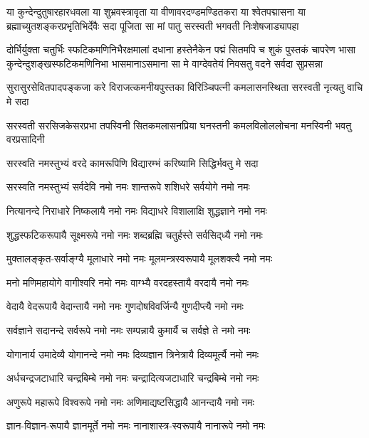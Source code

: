 

\fourlineindentedshloka
{या कुन्देन्दुतुषारहारधवला या शुभ्रवस्त्रावृता}
{या वीणावरदण्डमण्डितकरा या श्वेतपद्मासना}
{या ब्रह्माच्युतशङ्करप्रभृतिभिर्देवैः सदा पूजिता}
{सा मां पातु सरस्वती भगवती निःशेषजाड्यापहा}

\fourlineindentedshloka
{दोर्भिर्युक्ता चतुर्भिः स्फटिकमणिनिभैरक्षमालां दधाना}
{हस्तेनैकेन पद्मं सितमपि च शुकं पुस्तकं चापरेण}
{भासा कुन्देन्दुशङ्खस्फटिकमणिनिभा भासमानाऽसमाना}
{सा मे वाग्देवतेयं निवसतु वदने सर्वदा सुप्रसन्ना}

\fourlineindentedshloka
{सुरासुरसेवितपादपङ्कजा}
{करे विराजत्कमनीयपुस्तका}
{विरिञ्चिपत्नी कमलासनस्थिता}
{सरस्वती नृत्यतु वाचि मे सदा}

\fourlineindentedshloka
{सरस्वती सरसिजकेसरप्रभा}
{तपस्विनी सितकमलासनप्रिया}
{घनस्तनी कमलविलोललोचना}
{मनस्विनी भवतु वरप्रसादिनी}

\twolineshloka
{सरस्वति नमस्तुभ्यं वरदे कामरूपिणि}
{विद्यारम्भं करिष्यामि सिद्धिर्भवतु मे सदा}

\twolineshloka
{सरस्वति नमस्तुभ्यं सर्वदेवि नमो नमः}
{शान्तरूपे शशिधरे सर्वयोगे नमो नमः}

\twolineshloka
{नित्यानन्दे निराधारे निष्कलायै नमो नमः}
{विद्याधरे विशालाक्षि शुद्धज्ञाने नमो नमः}

\twolineshloka
{शुद्धस्फटिकरूपायै सूक्ष्मरूपे नमो नमः}
{शब्दब्रह्मि चतुर्हस्ते सर्वसिद्‌ध्यै नमो नमः}

\twolineshloka
{मुक्तालङ्कृत-सर्वाङ्ग्यै मूलाधारे नमो नमः}
{मूलमन्त्रस्वरूपायै मूलशक्त्यै नमो नमः}

\twolineshloka
{मनो मणिमहायोगे वागीश्वरि नमो नमः}
{वाग्भ्यै वरदहस्तायै वरदायै नमो नमः}

\twolineshloka
{वेदायै वेदरूपायै वेदान्तायै नमो नमः}
{गुणदोषविवर्जिन्यै गुणदीप्त्यै नमो नमः}

\twolineshloka
{सर्वज्ञाने सदानन्दे सर्वरूपे नमो नमः}
{सम्पन्नायै कुमार्यै च सर्वज्ञे ते नमो नमः}

\twolineshloka
{योगानार्य उमादेव्यै योगानन्दे नमो नमः}
{दिव्यज्ञान त्रिनेत्रायै दिव्यमूर्त्यै नमो नमः}

\twolineshloka
{अर्धचन्द्रजटाधारि चन्द्रबिम्बे नमो नमः}
{चन्द्रादित्यजटाधारि चन्द्रबिम्बे नमो नमः}

\twolineshloka
{अणुरूपे महारूपे विश्वरूपे नमो नमः}
{अणिमाद्यष्टसिद्धायै आनन्दायै नमो नमः}

\twolineshloka
{ज्ञान-विज्ञान-रूपायै ज्ञानमूर्ते नमो नमः}
{नानाशास्त्र-स्वरूपायै नानारूपे नमो नमः}

